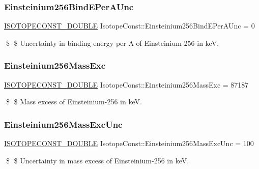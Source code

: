 \subsubsection{\texorpdfstring{Einsteinium256\+Bind\+E\+Per\+A\+Unc}{Einsteinium256BindEPerAUnc}}
{\footnotesize\ttfamily \mbox{\hyperlink{group___isotope_const-_macros_ga8f45a7272ce02c0b4c65c44636ed719a}{I\+S\+O\+T\+O\+P\+E\+C\+O\+N\+S\+T\+\_\+\+D\+O\+U\+B\+LE}} Isotope\+Const\+::\+Einsteinium256\+Bind\+E\+Per\+A\+Unc = 0}

\$ \$ Uncertainty in binding energy per A of Einsteinium-\/256 in keV. \mbox{\label{group___isotope_const-_einsteinium-_es256_ga7f49dc5de7ff72a6a568a1c88a0ca416}} 
\subsubsection{\texorpdfstring{Einsteinium256\+Mass\+Exc}{Einsteinium256MassExc}}
{\footnotesize\ttfamily \mbox{\hyperlink{group___isotope_const-_macros_ga8f45a7272ce02c0b4c65c44636ed719a}{I\+S\+O\+T\+O\+P\+E\+C\+O\+N\+S\+T\+\_\+\+D\+O\+U\+B\+LE}} Isotope\+Const\+::\+Einsteinium256\+Mass\+Exc = 87187}

\$ \$ Mass excess of Einsteinium-\/256 in keV. \mbox{\label{group___isotope_const-_einsteinium-_es256_gae26d4d243dcc2b2c2ff600ae8cb8613c}} 
\subsubsection{\texorpdfstring{Einsteinium256\+Mass\+Exc\+Unc}{Einsteinium256MassExcUnc}}
{\footnotesize\ttfamily \mbox{\hyperlink{group___isotope_const-_macros_ga8f45a7272ce02c0b4c65c44636ed719a}{I\+S\+O\+T\+O\+P\+E\+C\+O\+N\+S\+T\+\_\+\+D\+O\+U\+B\+LE}} Isotope\+Const\+::\+Einsteinium256\+Mass\+Exc\+Unc = 100}

\$ \$ Uncertainty in mass excess of Einsteinium-\/256 in keV. \mbox{\label{group___isotope_const-_einsteinium-_es256_ga54d628b85b091af71265f948021e9541}} 
